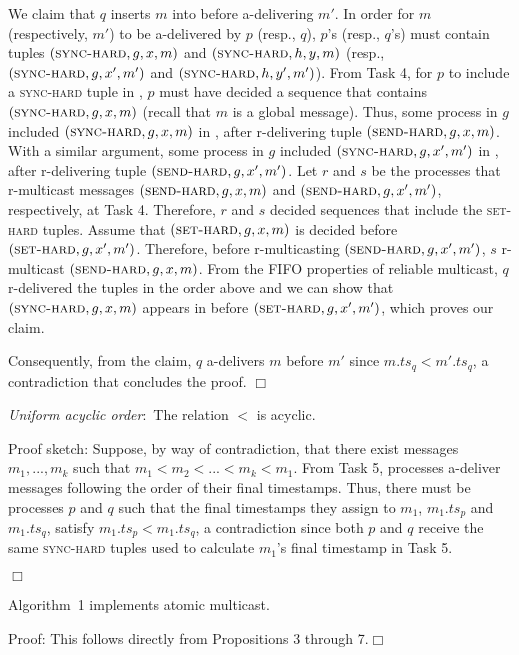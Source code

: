 We claim that $q$ inserts $m$ into \Buffer before a-delivering $m'$. 
In order for $m$ (respectively, $m'$) to be a-delivered by $p$ (resp., $q$), $p$'s (resp., $q$'s) \Buffer must contain tuples $(\textsc{sync-hard}, g, x, m)$ and $(\textsc{sync-hard}, h, y, m)$ (resp., $(\textsc{sync-hard}, g, x', m')$ and $(\textsc{sync-hard}, h, y', m')$).
From Task 4, for $p$ to include a \textsc{sync-hard} tuple in \Buffer, $p$ must have decided a sequence that contains $(\textsc{sync-hard}, g, x, m)$ (recall that $m$ is a global message).
Thus, some process in $g$ included $(\textsc{sync-hard}, g, x, m)$ in \Pend, after r-delivering tuple  $(\textsc{send-hard}, g, x, m)$.
With a similar argument, some process in $g$ included $(\textsc{sync-hard}, g, x', m')$ in \Pend, after r-delivering tuple $(\textsc{send-hard}, g, x', m')$.
Let $r$ and $s$ be the processes that r-multicast messages $(\textsc{send-hard}, g, x, m)$ and $(\textsc{send-hard}, g, x', m')$, respectively, at Task 4.
Therefore, $r$ and $s$ decided sequences that include the \textsc{set-hard} tuples.
Assume that $(\textsc{set-hard}, g, x, m)$ is decided before $(\textsc{set-hard}, g, x', m')$.
Therefore, before r-multicasting $(\textsc{send-hard}, g, x', m')$, $s$ r-multicast $(\textsc{send-hard}, g, x, m)$.
From the FIFO properties of reliable multicast, $q$ r-delivered the tuples in the order above and we can show that $(\textsc{sync-hard}, g, x, m)$ appears in \Buffer before $(\textsc{set-hard}, g, x', m')$, which proves our claim.

Consequently, from the claim, $q$ a-delivers $m$ before $m'$ since $m.ts_q < m'.ts_q$, a contradiction that concludes the proof.
\hfill$\Box$

\begin{proposition}
\textit{Uniform acyclic order}:~The relation $<$ is acyclic.
\end{proposition}
\noindent
{\sc Proof sketch:} 
Suppose, by way of contradiction, that there exist messages $m_1, ..., m_k$ such that $m_1 < m_2 < ... < m_k < m_1$. 
From Task 5, processes a-deliver messages following the order of their final timestamps.
Thus, there must be processes $p$ and $q$ such that the final timestamps they assign to $m_1$, $m_1.ts_p$ and  $m_1.ts_q$, satisfy $m_1.ts_p < m_1.ts_q$, a contradiction since both $p$ and $q$ receive the same \textsc{sync-hard} tuples used to calculate $m_1$'s final timestamp in Task 5.


\hfill$\Box$

\begin{theorem}
Algorithm~1 implements atomic multicast.
\end{theorem}
\noindent
{\sc Proof:} 
This follows directly from Propositions 3 through 7.\hfill$\Box$

